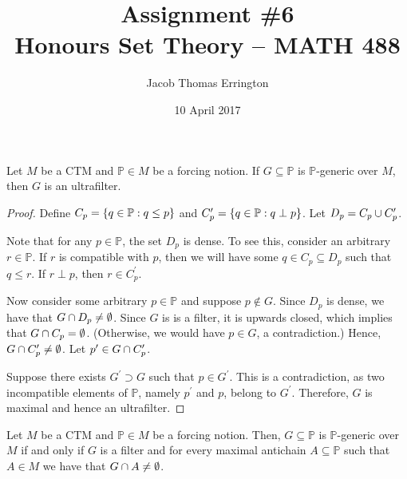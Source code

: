 \documentclass[11pt]{article}
\author{Jacob Thomas Errington}
\title{Assignment \#6\\Honours Set Theory -- MATH 488}
\date{10 April 2017}
\renewcommand{\P}{\mathbb{P}}
\begin{document}
\maketitle

\begin{prop}
    Let $M$ be a CTM and $\P \in M$ be a forcing notion.
    If $G \subseteq \P$ is $\P$-generic over $M$, then $G$ is
    an ultrafilter.
\end{prop}

\begin{proof}
    Define $C_p = \setof{ q \in \P : q \leq p }$
    and $C^\prime_p = \setof{ q \in \P : q \perp p }$.
    Let $D_p = C_p \cup C^\prime_p$.

    Note that for any $p \in \P$, the set $D_p$ is dense.
    To see this, consider an arbitrary $r \in \P$.
    If $r$ is compatible with $p$, then we will have some
    $q \in C_p \subseteq D_p$ such that $q \leq r$.
    If $r \perp p$, then $r \in C^\prime_p$.

    Now consider some arbitrary $p \in \P$ and suppose $p \notin G$.
    Since $D_p$ is dense, we have that $G \cap D_p \neq \emptyset$.
    Since $G$ is is a filter, it is upwards closed, which implies that
    $G \cap C_p = \emptyset$. (Otherwise, we would have $p \in G$, a
    contradiction.)
    Hence, $G \cap C^\prime_p \neq \emptyset$.
    Let $p^\prime \in G \cap C^\prime_p$.

    Suppose there exists $G^\prime \supset G$ such that $p \in G^\prime$.
    This is a contradiction, as two incompatible elements of $\P$, namely
    $p^\prime$ and $p$, belong to $G^\prime$.
    Therefore, $G$ is maximal and hence an ultrafilter.
\end{proof}

\begin{prop}
    Let $M$ be a CTM and $\P \in M$ be a forcing notion.
    Then,
    $G \subseteq \P$ is $\P$-generic over $M$ if and only if $G$ is a filter
    and for every maximal antichain $A \subseteq \P$ such that $A \in M$ we
    have that $G \cap A \neq \emptyset$.
\end{prop}
\end{document}
